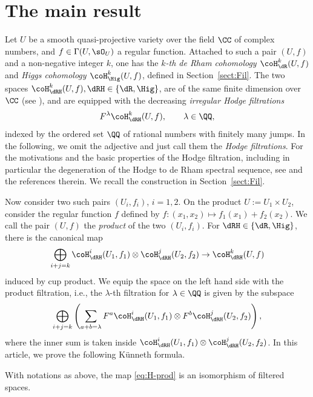 \section{The main result}

Let $U$ be a smooth quasi-projective variety over the field $\CC$ of complex numbers, and $f\in\Gamma(U,\sO_U)$ a regular function. Attached to such a pair $(U,f)$ and a non-negative integer $k$, one has the
\textit{$k$-th de Rham cohomology $\coH_\dR^k(U,f)$} and \textit{Higgs cohomology $\coH_\Hig^k(U,f)$}, defined in Section~\ref{sect:Fil}. The two spaces $\coH_\dRH^k(U,f), \dRH\in\{\dR, \Hig\}$, are of the same finite dimension over $\CC$ (see \cite[Remark~1.3.3]{ESY}), and are equipped with the decreasing \textit{irregular Hodge filtrations}
\begin{gather*} F^\lambda \coH_\dRH^k(U,f), \qquad \lambda \in \QQ, \end{gather*}
indexed by the ordered set $\QQ$ of rational numbers with finitely many jumps. In the following, we omit the adjective and just call them the \textit{Hodge filtrations}. For the motivations and the basic properties of the Hodge filtration, including in particular the degeneration of the Hodge to de Rham spectral sequence, see \cite{ESY, KKP} and the references therein. We recall the construction in Section~\ref{sect:Fil}.

Now consider two such pairs $(U_i,f_i)$, $i=1,2$. On the product $U:=U_1\times U_2$, consider the regular function $f$ defined by $f\colon (x_1,x_2) \mapsto f_1(x_1) + f_2(x_2)$. We call the pair $(U,f)$ the \textit{product} of the two $(U_i,f_i)$. For $\dRH \in \{\dR, \Hig\}$, there is the canonical map
\begin{gather}\label{eq:H-prod}
\bigoplus_{i+j=k} \coH_\dRH^i(U_1,f_1) \otimes \coH_\dRH^j(U_2,f_2) \to \coH^k_\dRH(U,f)
\end{gather}
induced by cup product. We equip the space on the left hand side with the product filtration, i.e., the $\lambda$-th filtration for $\lambda\in\QQ$ is given by the subspace
\begin{gather*} \bigoplus_{i+j=k}\left(\sum_{a +b = \lambda} F^a\coH^i_\dRH(U_1,f_1)\otimes F^b\coH^j_\dRH(U_2,f_2) \right), \end{gather*}
where the inner sum is taken inside $\coH_\dRH^i(U_1,f_1)\otimes \coH_\dRH^j(U_2,f_2)$. In this article, we prove the following K\"unneth formula.

\begin{theorem}\label{Thm:Kunneth}
With notations as above, the map \eqref{eq:H-prod} is an isomorphism of filtered spaces.
\end{theorem}

